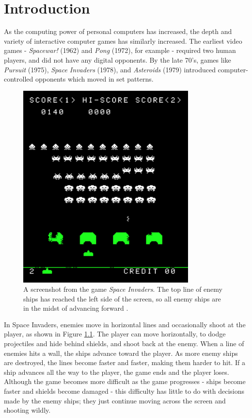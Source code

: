 \chapter{Introduction}
As the computing power of personal computers has increased, the depth and variety of interactive computer games has similarly increased. The earliest video games - \textit{Spacewar!} (1962) and \textit{Pong} (1972), for example - required two human players, and did not have any digital opponents. By the late 70's, games like \textit{Pursuit} (1975), \textit{Space Invaders} (1978), and \textit{Asteroids} (1979) introduced computer-controlled opponents which moved in set patterns.\\

\begin{figure}[H]
  \centering
  \includegraphics[width=9cm]{figures/space-invaders.png}
  \caption{A screenshot from the game \textit{Space Invaders}. The top line of enemy ships has reached the left side of the screen, so all enemy ships are in the midst of advancing forward \cite{spaceinvaders78}.}
  \label{fig:SpaceInvaders}
\end{figure}

In Space Invaders, enemies move in horizontal lines and occasionally shoot at the player, as shown in Figure \ref{fig:SpaceInvaders}. The player can move horizontally, to dodge projectiles and hide behind shields, and shoot back at the enemy. When a line of enemies hits a wall, the ships advance toward the player. As more enemy ships are destroyed, the lines become faster and faster, making them harder to hit. If a ship advances all the way to the player, the game ends and the player loses. Although the game becomes more difficult as the game progresses - ships become faster and shields become damaged - this difficulty has little to do with decisions made by the enemy ships; they just continue moving across the screen and shooting wildly.\\

